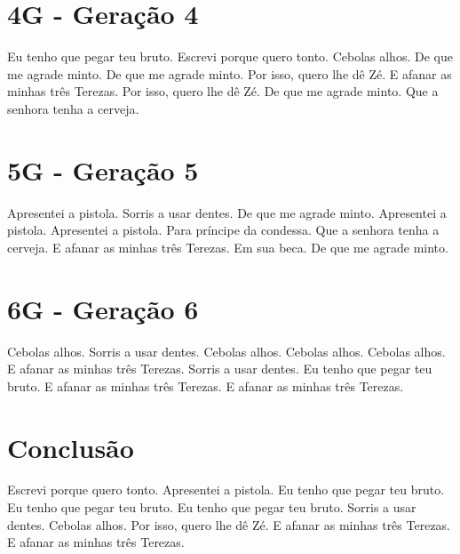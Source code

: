 \documentclass[11pt,oneside,a4paper]{abntex2}
\begin{document}
\section*{4G - Geração 4}
\label{4g}

Eu tenho que pegar teu bruto. Escrevi porque quero tonto. Cebolas alhos. De que me agrade minto. De que me agrade minto. Por isso, quero lhe dê Zé. E afanar as minhas três Terezas. Por isso, quero lhe dê Zé. De que me agrade minto. Que a senhora tenha a cerveja.

\section*{5G - Geração 5}
\label{5g}

Apresentei a pistola. Sorris a usar dentes. De que me agrade minto. Apresentei a pistola. Apresentei a pistola. Para príncipe da condessa. Que a senhora tenha a cerveja. E afanar as minhas três Terezas. Em sua beca. De que me agrade minto.

\section*{6G - Geração 6}
\label{6g}

Cebolas alhos. Sorris a usar dentes. Cebolas alhos. Cebolas alhos. Cebolas alhos. E afanar as minhas três Terezas. Sorris a usar dentes. Eu tenho que pegar teu bruto. E afanar as minhas três Terezas. E afanar as minhas três Terezas.

\section*{Conclusão}
\label{conclusao}

Escrevi porque quero tonto. Apresentei a pistola. Eu tenho que pegar teu bruto. Eu tenho que pegar teu bruto. Eu tenho que pegar teu bruto. Sorris a usar dentes. Cebolas alhos. Por isso, quero lhe dê Zé. E afanar as minhas três Terezas. E afanar as minhas três Terezas.


\label{biblio}
\end{document}
